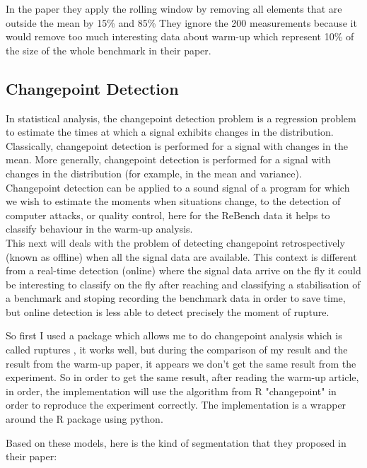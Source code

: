 \documentclass[12pt,a4paper]{article}
\begin{document}
In the paper they apply the rolling window by removing all elements that are outside the mean by 15\% and 85\% They ignore the 200 measurements because it would remove too much interesting data about warm-up which represent 10\% of the size of the whole benchmark in their paper.


\subsection{Changepoint Detection}
In statistical analysis,  the changepoint detection problem is a regression problem to estimate the times at which a signal exhibits changes in the distribution. Classically, changepoint detection is performed for a signal with changes in the mean. More generally, changepoint detection is performed for a signal with changes in the distribution (for example, in the mean and variance). \\

Changepoint detection can be applied to a sound signal of a program for which we wish to estimate the moments when situations change, to the detection of computer attacks, or quality control, here for the ReBench data it helps to classify behaviour in the warm-up analysis. \\

This next will deals with the problem of detecting changepoint retrospectively (known as offline) when all the signal data are available. This context is different from a real-time detection (online) where the signal data arrive on the fly it could be interesting to classify on the fly after reaching and classifying a stabilisation of a benchmark and stoping recording the benchmark data in order to save time, but online detection is less able to detect precisely the moment of rupture.

So first I used a package which allows me to do changepoint analysis which is called ruptures \citep{truong2020selective}, it works well, but during the comparison of my result and the result from the warm-up paper, it appears we don't get the same result from the experiment. So in order to get the same result, after reading the warm-up article, in order, the implementation will use the algorithm from R "changepoint" \citep{killick2014changepoint} in order to reproduce the experiment correctly. The implementation is a wrapper around the R package using python. 

Based on these models, here is the kind of segmentation that they proposed in their paper:
\end{document}
